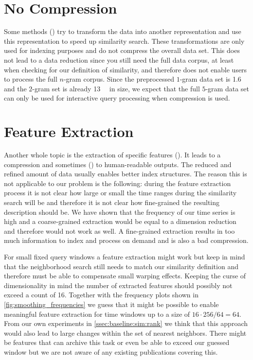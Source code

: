 \section{No Compression}
\label{sec:prior:nocompression}

Some methods (\cite{dimred3,dimred4}) try to transform the data into another representation and use this representation to speed up similarity search. These transformations are only used for indexing purposes and do not compress the overall data set. This does not lead to a data reduction since you still need the full data corpus, at least when checking for our definition of similarity, and therefore does not enable users to process the full $n$-gram corpus. Since the preprocessed $1$-gram data set is \SI{1.6}{\giga\byte} and the $2$-gram set is already \SI{13}{\giga\byte} in size, we expect that the full $5$-gram data set can only be used for interactive query processing when compression is used.



\section{Feature Extraction}
\label{sec:prior:extract}

Another whole topic is the extraction of specific features (\cite{compress1,compress2,compress3,compress4,compress5}). It leads to a compression and sometimes (\cite{compress1}) to human-readable outputs. The reduced and refined amount of data usually enables better index structures. The reason this is not applicable to our problem is the following: during the feature extraction process it is not clear how large or small the time ranges during the similarity search will be and therefore it is not clear how fine-grained the resulting description should be. We have shown that the frequency of our time series is high and a coarse-grained extraction would be equal to a dimension reduction and therefore would not work as well. A fine-grained extraction results in too much information to index and process on demand and is also a bad compression.

For small fixed query windows a feature extraction might work but keep in mind that the neighborhood search still needs to match our similarity definition and therefore must be able to compensate small warping effects. Keeping the curse of dimensionality in mind the number of extracted features should possibly not exceed a count of \num{16}. Together with the frequency plots shown in \autoref{fig:smoothing_frequencies} we guess that it might be possible to enable meaningful feature extraction for time windows up to a size of $16 \cdot 256/64 = 64$. From our own experiments in \autoref{ssec:baseline:sim:rank} we think that this approach would also lead to large changes within the set of nearest neighbors. There might be features that can archive this task or even be able to exceed our guessed window but we are not aware of any existing publications covering this.




